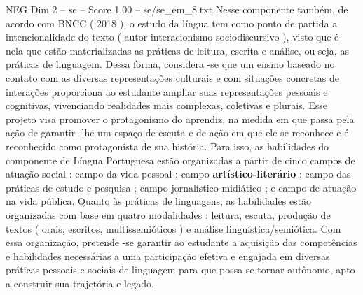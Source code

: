 \begin{textsample}{NEG Dim 2 – se – Score 1.00 – se/se\_em\_8.txt}
Nesse componente também, de acordo com BNCC ( 2018 ), o estudo da língua tem como ponto de partida a intencionalidade do texto ( autor interacionismo sociodiscursivo ), visto que é nela que estão materializadas as práticas de leitura, escrita e análise, ou seja, as práticas de linguagem.
Dessa forma, considera -se que um ensino baseado no contato com as diversas representações culturais e com situações concretas de interações proporciona ao estudante ampliar suas representações pessoais e cognitivas, vivenciando realidades mais complexas, coletivas e plurais.
Esse projeto visa promover o protagonismo do aprendiz, na medida em que passa pela ação de garantir -lhe um espaço de escuta e de ação em que ele se reconhece e é reconhecido como protagonista de sua história.
Para isso, as habilidades do componente de Língua Portuguesa estão organizadas a partir de cinco campos de atuação social : campo da vida pessoal ; campo \textbf{artístico-literário} ; campo das práticas de estudo e pesquisa ; campo jornalístico-midiático ; e campo de atuação na vida pública.
Quanto às práticas de linguagens, as habilidades estão organizadas com base em quatro modalidades : leitura, escuta, produção de textos ( orais, escritos, multissemióticos ) e análise linguística/semiótica.
Com essa organização, pretende -se garantir ao estudante a aquisição das competências e habilidades necessárias a uma participação efetiva e engajada em diversas práticas pessoais e sociais de linguagem para que possa se tornar autônomo, apto a construir sua trajetória e legado.

\end{textsample}
